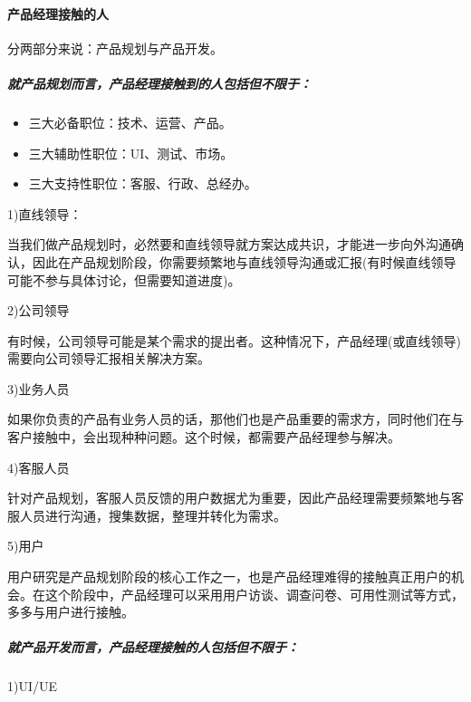 \documentclass[letterpaper,11pt,english]{sphinxmanual}
\begin{document}
\paragraph{产品经理接触的人}
\label{\detokenize{chapter_introduction/PM:id29}}
分两部分来说：产品规划与产品开发。


\subparagraph{就产品规划而言，产品经理接触到的人包括但不限于：}
\label{\detokenize{chapter_introduction/PM:prod-people}}\label{\detokenize{chapter_introduction/PM:id30}}
%
\begin{footnote}[149]\sphinxAtStartFootnote
{}
%
\end{footnote}
\begin{itemize}
\item {} 
三大必备职位：技术、运营、产品。

\item {} 
三大辅助性职位：UI、测试、市场。

\item {} 
三大支持性职位：客服、行政、总经办。

\end{itemize}

1)直线领导：

当我们做产品规划时，必然要和直线领导就方案达成共识，才能进一步向外沟通确认，因此在产品规划阶段，你需要频繁地与直线领导沟通或汇报(有时候直线领导可能不参与具体讨论，但需要知道进度)。

2)公司领导

有时候，公司领导可能是某个需求的提出者。这种情况下，产品经理(或直线领导)需要向公司领导汇报相关解决方案。

3)业务人员

如果你负责的产品有业务人员的话，那他们也是产品重要的需求方，同时他们在与客户接触中，会出现种种问题。这个时候，都需要产品经理参与解决。

4)客服人员

针对产品规划，客服人员反馈的用户数据尤为重要，因此产品经理需要频繁地与客服人员进行沟通，搜集数据，整理并转化为需求。

5)用户

用户研究是产品规划阶段的核心工作之一，也是产品经理难得的接触真正用户的机会。在这个阶段中，产品经理可以采用用户访谈、调查问卷、可用性测试等方式，多多与用户进行接触。


\subparagraph{就产品开发而言，产品经理接触的人包括但不限于：}
\label{\detokenize{chapter_introduction/PM:id31}}
1)UI/UE
\end{document}
